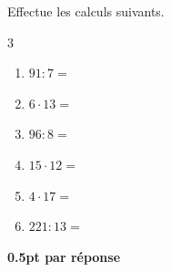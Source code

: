 \question[3]
Effectue les calculs suivants.


\vspace{10pt}
\setlength{\columnsep}{50pt}
\begin{multicols}{3}
\begin{enumerate}[leftmargin=*,align=parleft, label=\alph*), itemsep=25pt]
\item $91 : 7=$ 
\item $6 \cdot 13=$ 
\item $96 : 8=$ 
\item $15 \cdot 12=$ 
\item $4 \cdot 17=$ 
\item $221 : 13=$ 
\end{enumerate}
\end{multicols}
\setlength{\columnsep}{10pt}

\begin{solution}[0pt]
\textbf{0.5pt par réponse}
\end{solution}
